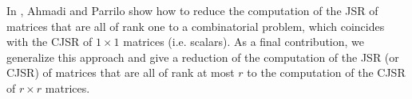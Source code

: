 In \cite{ahmadi2012joint}, Ahmadi and Parrilo show how to reduce the computation of the JSR
of matrices that are all of rank one to a combinatorial problem,
which coincides with the CJSR of $1 \times 1$ matrices (i.e. scalars).
As a final contribution, we generalize
this approach and give a reduction of the computation of the JSR (or CJSR)
of matrices that are all of rank at most $r$ to the computation of the CJSR of $r \times r$ matrices.
